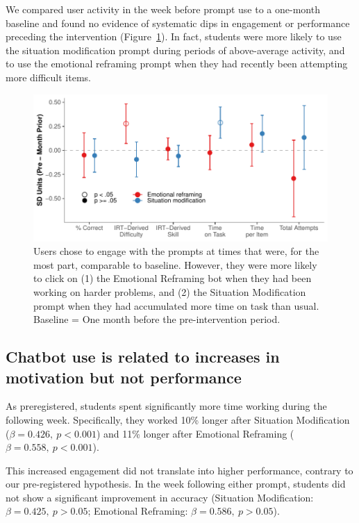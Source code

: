 \documentclass[11pt]{report}
\begin{document}
\begin{mainf}
We compared user activity in the week before prompt use to a one-month baseline and found no evidence of systematic dips in engagement or performance preceding the intervention (Figure~\ref{fig:when_engage}). 
In fact, students were more likely to use the situation modification prompt during periods of above-average activity, and to use the emotional reframing prompt when they had recently been attempting more difficult items.


\begin{figure}
    \centering
    \includegraphics[width=\linewidth]{when_engage.pdf}
    \caption{Users chose to engage with the prompts at times that were, for the most part, comparable to baseline. However, they were more likely to click on (1) the Emotional Reframing bot when they had been working on harder problems, and (2) the Situation Modification prompt when they had accumulated more time on task than usual. Baseline = One month before the pre-intervention period.}
    \label{fig:when_engage}
\end{figure}

\subsection*{Chatbot use is related to increases in motivation but not performance}

As preregistered, students spent significantly more time working during the following week. 
Specifically, they worked 10\% longer after Situation Modification (\(\beta=0.426,\ p<0.001\)) and 11\% longer after Emotional Reframing (\(\beta=0.558,\ p<0.001\)).

This increased engagement did not translate into higher performance, contrary to our pre-registered hypothesis. 
In the week following either prompt, students did not show a significant improvement in accuracy (Situation Modification: \(\beta=0.425,\ p>0.05\); Emotional Reframing: \(\beta=0.586,\ p>0.05\)).


\end{mainf}
\end{document}
